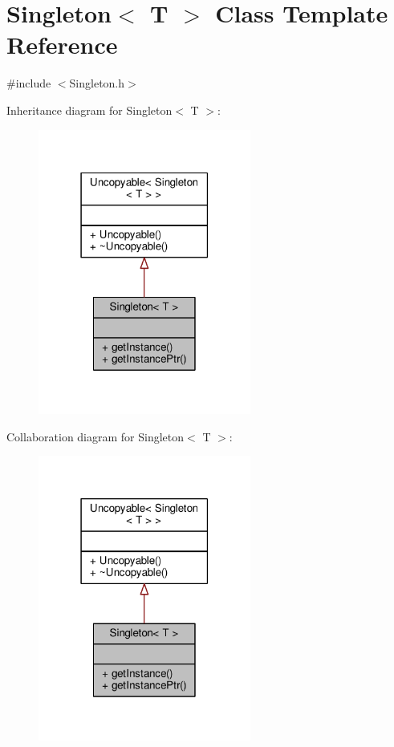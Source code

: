 \hypertarget{classSingleton}{\section{Singleton$<$ T $>$ Class Template Reference}
\label{classSingleton}
}


{\ttfamily \#include $<$Singleton.\-h$>$}



Inheritance diagram for Singleton$<$ T $>$\-:
\nopagebreak
\begin{figure}[H]
\begin{center}
\leavevmode
\includegraphics[width=198pt]{classSingleton__inherit__graph}
\end{center}
\end{figure}


Collaboration diagram for Singleton$<$ T $>$\-:
\nopagebreak
\begin{figure}[H]
\begin{center}
\leavevmode
\includegraphics[width=198pt]{classSingleton__coll__graph}
\end{center}
\end{figure}
